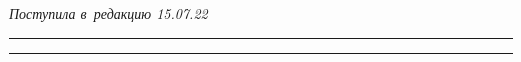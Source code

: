 \vspace*{-6pt}





\hfill{\small\textit{Поступила в~редакцию 15.07.22}}





\vspace*{8pt}




















\hrule





\vspace*{2pt}





\hrule










\def\tit{CONTROLLABLE QUEUING SYSTEM WITH ELASTIC TRAFFIC 


AND~SIGNALS FOR~ANALYZING NETWORK SLICING}








\def\titkol{Controllable queuing system with elastic traffic 


and~signals for~analyzing network slicing}








\def\aut{A.\,S.~Vlaskina$^1$, S.\,A.~Burtseva$^1$, I.\,A.~Kochetkova$^{1,2}$, 


and~S.\,Ya.~Shorgin$^2$}





\def\autkol{A.\,S.~Vlaskina, S.\,A.~Burtseva, I.\,A.~Kochetkova, 


and~S.\,Ya.~Shorgin}





